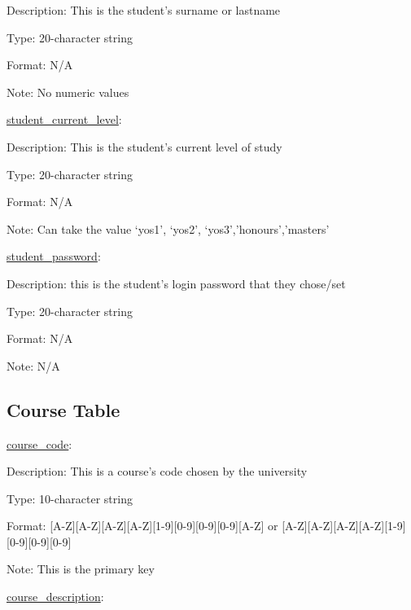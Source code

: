 \documentclass[10pt]{article}
\begin{document}
\begin{description}[font=$\bullet$~\normalfont\scshape\color{red!50!black}]    
\item []  Description: This is the student’s surname or lastname
\item [] Type: 20-character string
\item [] Format: N/A
\item []  Note: No numeric values
\end{description}   
\underline{student\_current\_level}:

\begin{description}[font=$\bullet$~\normalfont\scshape\color{red!50!black}]
\item [] Description: This is the student’s current level of study
\item []  Type: 20-character string
\item []  Format: N/A
\item [] Note: Can take the value ‘yos1’, ‘yos2’, ‘yos3’,’honours’,’masters’
\end{description}
\underline{student\_password}:

\begin{description}[font=$\bullet$~\normalfont\scshape\color{red!50!black}]
\item []  Description: this is the student’s login password that they chose/set
\item []  Type: 20-character string
\item []  Format: N/A
\item []  Note: N/A
\end{description}


\subsection{Course Table}

\underline{course\_code}:

\begin{description}[font=$\bullet$~\normalfont\scshape\color{red!50!black}]

\item [] Description: This is a course’s code chosen by the university
\item [] Type: 10-character string
\item [] Format: [A-Z][A-Z][A-Z][A-Z][1-9][0-9][0-9][0-9][A-Z] or [A-Z][A-Z][A-Z][A-Z][1-9][0-9][0-9][0-9]
\item [] Note: This is the primary key

\end{description}
\underline{course\_description}:
\end{document}
